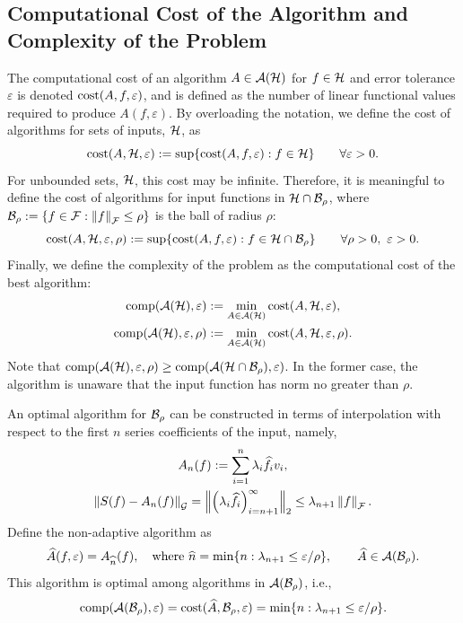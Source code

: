 \documentclass[graybox,footinfo]{svmult}
\newcommand{\DHJRnorm}[2][{}]{\ensuremath{\left \lVert #2 \right \rVert}_{#1}}
\newcommand{\DHJRBignorm}[2][{}]{\ensuremath{\Bigl \lVert #2 \Bigr \rVert}_{#1}}
\begin{document}
\subsection{Computational Cost of the Algorithm and Complexity of the Problem}
\label{subsec:costandcomplex}
The computational cost of an algorithm $A \in {\mathcal{A}}({\mathcal{H}})$ for $f \in {\mathcal{H}}$ and error tolerance $\varepsilon$ is denoted $\textup{cost}(A,f,\varepsilon)$, and is defined as the number of linear functional values required to produce $A(f,\varepsilon)$.  By overloading the notation, we define the cost of algorithms for sets of inputs, ${\mathcal{H}}$, as 
\begin{equation*}
\textup{cost}(A,{\mathcal{H}},\varepsilon) : = \sup \{\textup{cost}(A,f,\varepsilon) : f \in {\mathcal{H}} \} \qquad \forall \varepsilon > 0.
\end{equation*}
For unbounded sets, ${\mathcal{H}}$, this cost may be infinite.  Therefore, it is meaningful to define the cost of algorithms for input functions in ${\mathcal{H}} \cap {\mathcal{B}}_{\rho}$, where $\calB_{\rho} : = \{ f \in \calF : \DHJRnorm[\calF]{f} \le \rho \}$ is the ball of radius $\rho$:
\begin{equation*}
\textup{cost}(A,{\mathcal{H}},\varepsilon,\rho) : = \sup \{\textup{cost}(A,f,\varepsilon) : f \in {\mathcal{H}} \cap {\mathcal{B}}_{\rho} \} \qquad \forall \rho > 0, \ \varepsilon > 0.
\end{equation*}
Finally, we define the complexity of the problem as the computational cost of the best algorithm:
\begin{gather*}
\textup{comp}({\mathcal{A}}({\mathcal{H}}),\varepsilon) := \min_{A \in {\mathcal{A}}({\mathcal{H}})} \textup{cost}(A, {\mathcal{H}}, \varepsilon), \\
\textup{comp}({\mathcal{A}}({\mathcal{H}}),\varepsilon,\rho) := \min_{A \in {\mathcal{A}}({\mathcal{H}})} \textup{cost}(A, {\mathcal{H}}, \varepsilon, \rho).
\end{gather*}
Note that $\textup{comp}({\mathcal{A}}({\mathcal{H}}),\varepsilon,\rho) \ge \textup{comp}({\mathcal{A}}({\mathcal{H}} \cap {\mathcal{B}}_{\rho}),\varepsilon)$.  In the former case, the algorithm is unaware  that the input function has norm no greater than $\rho$.  

An optimal algorithm for ${\mathcal{B}}_{\rho}$ can be constructed in terms of interpolation with respect to the first $n$ series coefficients of the input, namely,
\begin{gather}  \label{optAdef}
A_n(f) := \sum_{i=1}^n \lambda_{i} \widehat{f}_{i} v_{i}, \\
\label{errOpt}
\DHJRnorm[\calG]{S(f) - A_n(f)} = \DHJRBignorm[2]{\left(\lambda_{i} \widehat{f}_{i} \right)_{i= n+1}^{\infty}} \le \lambda_{n+1} \DHJRnorm[\calF]{f}.
\end{gather}
Define the non-adaptive algorithm as
\begin{equation} \label{optBallalg}
\widehat{A}(f,\varepsilon) = A_{\widehat{n}}(f), \quad \text{where } \widehat{n}= \min\{ n : \lambda_{n+1} \le \varepsilon/\rho \}, \qquad \widehat{A} \in \calA(\calB_{\rho}).
\end{equation}
This algorithm is optimal among algorithms in ${\mathcal{A}}({\mathcal{B}}_{\rho})$, i.e.,
\[
\textup{comp}({\mathcal{A}}({\mathcal{B}}_{\rho}),\varepsilon) = \textup{cost}(\widehat{A},{\mathcal{B}}_{\rho},\varepsilon) =
\min\{ n : \lambda_{n+1} \le \varepsilon/\rho \}.
\]
\end{document}
